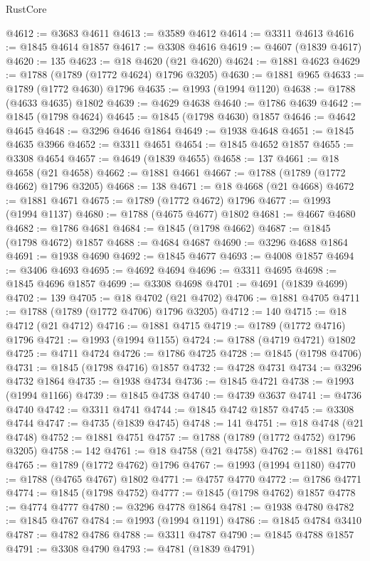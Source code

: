 \begin{lexlean}{RustCore}
\begin{coremodule}
@4612 := @3683 @4611
@4613 := @3589 @4612
@4614 := @3311 @4613
@4616 := @1845 @4614 @1857
@4617 := @3308 @4616
@4619 := @4607 (@1839 @4617)
@4620 := 135
@4623 := @18 @4620 (@21 @4620)
@4624 := @1881 @4623
@4629 := @1788 (@1789 (@1772 @4624) @1796 @3205)
@4630 := @1881 @965
@4633 := @1789 (@1772 @4630) @1796
@4635 := @1993 (@1994 @1120)
@4638 := @1788 (@4633 @4635) @1802
@4639 := @4629 @4638
@4640 := @1786 @4639
@4642 := @1845 (@1798 @4624)
@4645 := @1845 (@1798 @4630) @1857
@4646 := @4642 @4645
@4648 := @3296 @4646 @1864
@4649 := @1938 @4648
@4651 := @1845 @4635 @3966
@4652 := @3311 @4651
@4654 := @1845 @4652 @1857
@4655 := @3308 @4654
@4657 := @4649 (@1839 @4655)
@4658 := 137
@4661 := @18 @4658 (@21 @4658)
@4662 := @1881 @4661
@4667 := @1788 (@1789 (@1772 @4662) @1796 @3205)
@4668 := 138
@4671 := @18 @4668 (@21 @4668)
@4672 := @1881 @4671
@4675 := @1789 (@1772 @4672) @1796
@4677 := @1993 (@1994 @1137)
@4680 := @1788 (@4675 @4677) @1802
@4681 := @4667 @4680
@4682 := @1786 @4681
@4684 := @1845 (@1798 @4662)
@4687 := @1845 (@1798 @4672) @1857
@4688 := @4684 @4687
@4690 := @3296 @4688 @1864
@4691 := @1938 @4690
@4692 := @1845 @4677
@4693 := @4008 @1857
@4694 := @3406 @4693
@4695 := @4692 @4694
@4696 := @3311 @4695
@4698 := @1845 @4696 @1857
@4699 := @3308 @4698
@4701 := @4691 (@1839 @4699)
@4702 := 139
@4705 := @18 @4702 (@21 @4702)
@4706 := @1881 @4705
@4711 := @1788 (@1789 (@1772 @4706) @1796 @3205)
@4712 := 140
@4715 := @18 @4712 (@21 @4712)
@4716 := @1881 @4715
@4719 := @1789 (@1772 @4716) @1796
@4721 := @1993 (@1994 @1155)
@4724 := @1788 (@4719 @4721) @1802
@4725 := @4711 @4724
@4726 := @1786 @4725
@4728 := @1845 (@1798 @4706)
@4731 := @1845 (@1798 @4716) @1857
@4732 := @4728 @4731
@4734 := @3296 @4732 @1864
@4735 := @1938 @4734
@4736 := @1845 @4721
@4738 := @1993 (@1994 @1166)
@4739 := @1845 @4738
@4740 := @4739 @3637
@4741 := @4736 @4740
@4742 := @3311 @4741
@4744 := @1845 @4742 @1857
@4745 := @3308 @4744
@4747 := @4735 (@1839 @4745)
@4748 := 141
@4751 := @18 @4748 (@21 @4748)
@4752 := @1881 @4751
@4757 := @1788 (@1789 (@1772 @4752) @1796 @3205)
@4758 := 142
@4761 := @18 @4758 (@21 @4758)
@4762 := @1881 @4761
@4765 := @1789 (@1772 @4762) @1796
@4767 := @1993 (@1994 @1180)
@4770 := @1788 (@4765 @4767) @1802
@4771 := @4757 @4770
@4772 := @1786 @4771
@4774 := @1845 (@1798 @4752)
@4777 := @1845 (@1798 @4762) @1857
@4778 := @4774 @4777
@4780 := @3296 @4778 @1864
@4781 := @1938 @4780
@4782 := @1845 @4767
@4784 := @1993 (@1994 @1191)
@4786 := @1845 @4784 @3410
@4787 := @4782 @4786
@4788 := @3311 @4787
@4790 := @1845 @4788 @1857
@4791 := @3308 @4790
@4793 := @4781 (@1839 @4791)

\end{coremodule}
\end{lexlean}
